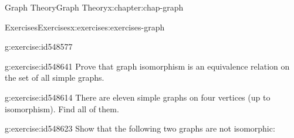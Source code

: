\documentclass[oneside,10pt,]{book}
\numberwithin{equation}{section}
\begin{document}
\begin{chapterptx}{Graph Theory}{}{Graph Theory}{}{}{x:chapter:chap-graph}
\begin{exercises-section}{Exercises}{}{Exercises}{}{}{x:exercises:exercises-graph}
\begin{divisionexercise}{13}{}{}{g:exercise:id548577}
\begin{sidebyside}{3}{0.0366666666666667}{0.0366666666666667}{0.0733333333333333}
\begin{sbspanel}{0.25}
{
}%
\end{sbspanel}%
\end{sidebyside}%
\end{divisionexercise}%
\begin{divisionexercise}{14}{}{}{g:exercise:id548641}%
Prove that graph isomorphism is an equivalence relation on the set of all simple graphs.%
\end{divisionexercise}%
\begin{divisionexercise}{15}{}{}{g:exercise:id548614}%
There are eleven simple graphs on four vertices (up to isomorphism). Find all of them.%
\end{divisionexercise}%
\begin{divisionexercise}{16}{}{}{g:exercise:id548623}%
Show that the following two graphs are not isomorphic:%
\begin{sidebyside}{2}{0.3}{0.3}{0.06}%
\begin{sbspanel}{0.17}%
\end{sbspanel}
\end{sidebyside}
\end{divisionexercise}
\end{exercises-section}
\end{chapterptx}
\end{document}
